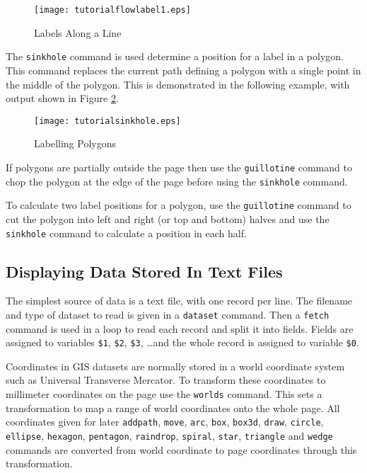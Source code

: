 

\begin{figure}[htb]
\texttt{[image: tutorialflowlabel1.eps]}
\caption{Labels Along a Line}
\label{tutoriallabels4}
\end{figure}

The \texttt{sinkhole} command is used determine a position
for a label in a polygon.  This command
replaces the current path defining a polygon with a single point in
the middle of the polygon.  This is demonstrated in the following
example, with output shown in Figure \ref{tutorialsinkhole}.



\begin{figure}[htb]
\texttt{[image: tutorialsinkhole.eps]}
\caption{Labelling Polygons}
\label{tutorialsinkhole}
\end{figure}

If polygons are partially outside the page then
use the \texttt{guillotine} command to chop the
polygon at the edge of the page before using the \texttt{sinkhole}
command.

To calculate two label positions for a polygon, use the \texttt{guillotine}
command to cut the polygon into left and right (or top and bottom)
halves and use the \texttt{sinkhole} command to calculate a
position in each half.

\subsection{Displaying Data Stored In Text Files}

The simplest source of data is a text file, with one record per line.  The
filename and type of dataset to read is given in a \texttt{dataset} command.
Then a \texttt{fetch} command is used in a loop to read each record
and split it into fields.
Fields are assigned to variables
\texttt{\$1}, \texttt{\$2}, \texttt{\$3}, \dots and the whole record is
assigned to variable \texttt{\$0}.

Coordinates in GIS datasets are normally stored
in a world coordinate system such as
Universal Transverse Mercator.  To transform these coordinates to millimeter
coordinates on the page use the \texttt{worlds} command.  This sets a
transformation to map a range of world coordinates onto the whole page.  All
coordinates given for later \texttt{addpath}, \texttt{move}, \texttt{arc},
\texttt{box},
\texttt{box3d},
\texttt{draw},
\texttt{circle},
\texttt{ellipse},
\texttt{hexagon},
\texttt{pentagon},
\texttt{raindrop},
\texttt{spiral},
\texttt{star},
\texttt{triangle}
and
\texttt{wedge}
commands are converted from world coordinate to page coordinates
through this transformation.

